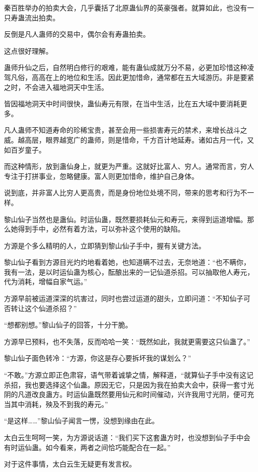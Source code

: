 \begin{this_body}
秦百胜举办的拍卖大会，几乎囊括了北原蛊仙界的英豪强者。就算如此，也没有一只寿蛊流出拍卖。

反倒是凡人蛊师的交易中，偶尔会有寿蛊拍卖。

这点很好理解。

蛊师升仙之后，自然明白修行的艰难，能有蛊仙成就万分不易，必更加珍惜这种凌驾凡俗，高高在上的地位和生活。因此更加惜命，通常都在五大域游历。非是要紧之时，不会进入福地洞天中生活。

皆因福地洞天中时间很快，蛊仙寿元有限，在当中生活，比在五大域中要消耗更多。

凡人蛊师不知道寿命的珍稀宝贵，甚至会用一些损害寿元的禁术，来增长战斗之威。越高层，眼界越宽广的蛊师，则是惜命，千方百计地延寿。诸如古月一代，又如百岁童子。

而这种情形，放到蛊仙身上，就更为严重。这就好比富人、穷人。通常而言，穷人专注于打拼事业，忽略健康。富人则更加惜命，维护自己身体。

说到底，并非富人比穷人更高贵，而是身份地位处境不同，带来的思考和行为不一样。

黎山仙子当然也是蛊仙。时运仙蛊，既然要损耗仙元和寿元，来得到运道增幅。那么她得到手中，必然有着方法，可以弥补这个使用的缺陷。

方源是个多么精明的人，立即猜到黎山仙子手中，握有关键方法。

黎山仙子看到方源目光灼灼地看着她，也知道瞒不过去，无奈地道：“也不瞒你，我有一法，是以时运仙蛊为核心，酝酿出来的一记仙道杀招。可以抽取他人寿元，代为消耗，增幅自家气运。”

方源早前被运道深深的坑害过，同时也尝过运道的甜头，立即问道：“不知仙子可否转让这个仙道杀招？”

“想都别想。”黎山仙子的回答，十分干脆。

方源早已预料，也不失落，反而哈哈一笑：“既然如此，我就更需要这只仙蛊了。”

黎山仙子面色转冷：“方源，你这是存心要拆坏我的谋划么？”

“不敢。”方源立即正色肃容，语气带着诚挚之情，解释道，“就算仙子手中没有这记杀招，我也要选择这个仙蛊。原因无它，只是因为我在拍卖大会中，获得一套寸光阴的凡道改良蛊方。时运仙蛊既然要用仙元和时间催动，兴许我用寸光阴，便可充当其中消耗，殃及不到我的寿元。”

“是这样……”黎山仙子闻言一愣，没想到缘由在此。

太白云生呵呵一笑，为方源说话道：“我们买下这套蛊方时，也没想到仙子手中会有时运仙蛊。如今看来，两者之间恰巧能配合在一起。”

对于这件事情，太白云生无疑更有发言权。


\end{this_body}
